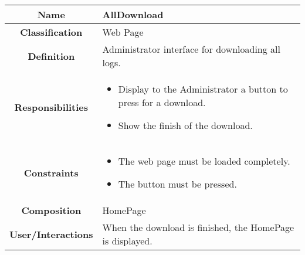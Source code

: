 \documentclass[11pt, a4paper,titlepage]{article}
\begin{document}
\begin{enumerate}
\begin{tabularx}{\textwidth}{| c | X |}
	\hline
	\textbf{Name} & 
	AllDownload
	\\
	\hline
	\textbf{Classification} & 
	Web Page
	\\
	\hline
	\textbf{Definition} & 
	Administrator interface for downloading all logs.\\
	\hline
	\textbf{Responsibilities} &
	\begin{itemize}
		\item Display to the Administrator a button to press for a download.
		\item Show the finish of the download.
	\end{itemize}
	\\
	\hline
	\textbf{Constraints} & 
	\begin{itemize}
		\item  The web page must be loaded completely.
		\item The button must be pressed.
	\end{itemize}
	\\
	\hline
	\textbf{Composition} & HomePage
	\\
	\hline
	\textbf{User/Interactions} & 
	When the download is finished, the HomePage is displayed.
	\\
	\hline	
\end{tabularx}


\end{enumerate}
\end{document}
